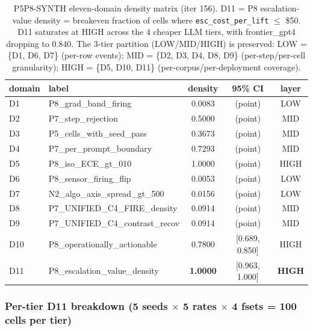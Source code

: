 \documentclass{article}
\begin{document}
\begin{table}[h]
\centering
\small
\begin{tabular}{l l c c c}
\hline
domain & label                              & density   & 95\% CI         & layer \\
\hline
D1     & P8\_grad\_band\_firing              & 0.0083    & (point)         & LOW   \\
D2     & P7\_step\_rejection                 & 0.5000    & (point)         & MID   \\
D3     & P5\_cells\_with\_seed\_pass         & 0.3673    & (point)         & MID   \\
D4     & P7\_per\_prompt\_boundary           & 0.7293    & (point)         & MID   \\
D5     & P8\_iso\_ECE\_gt\_010               & 1.0000    & (point)         & HIGH  \\
D6     & P8\_sensor\_firing\_flip            & 0.0053    & (point)         & LOW   \\
D7     & N2\_algo\_axis\_spread\_gt\_500     & 0.0156    & (point)         & LOW   \\
D8     & P7\_UNIFIED\_C4\_FIRE\_density      & 0.0914    & (point)         & MID   \\
D9     & P7\_UNIFIED\_C4\_contrast\_recov    & 0.0914    & (point)         & MID   \\
D10    & P8\_operationally\_actionable       & 0.7800    & [0.689, 0.850]  & HIGH  \\
D11    & P8\_escalation\_value\_density      & \textbf{1.0000} & [0.963, 1.000] & \textbf{HIGH} \\
\hline
\end{tabular}
\caption{P5P8-SYNTH eleven-domain density matrix (iter 156). D11 = P8
escalation-value density = breakeven fraction of cells where
\texttt{esc\_cost\_per\_lift} $\leq$ \$50. D11 saturates at HIGH
across the 4 cheaper LLM tiers, with frontier\_gpt4 dropping to
0.840. The 3-tier partition (LOW/MID/HIGH) is preserved: LOW = \{D1,
D6, D7\} (per-row events); MID = \{D2, D3, D4, D8, D9\}
(per-step/per-cell granularity); HIGH = \{D5, D10, D11\}
(per-corpus/per-deployment coverage).}
\label{tab:synth-iter156-eleven-domain}
\end{table}

\subsubsection{Per-tier D11 breakdown (5 seeds $\times$ 5 rates
$\times$ 4 fsets = 100 cells per tier)}
\end{document}
